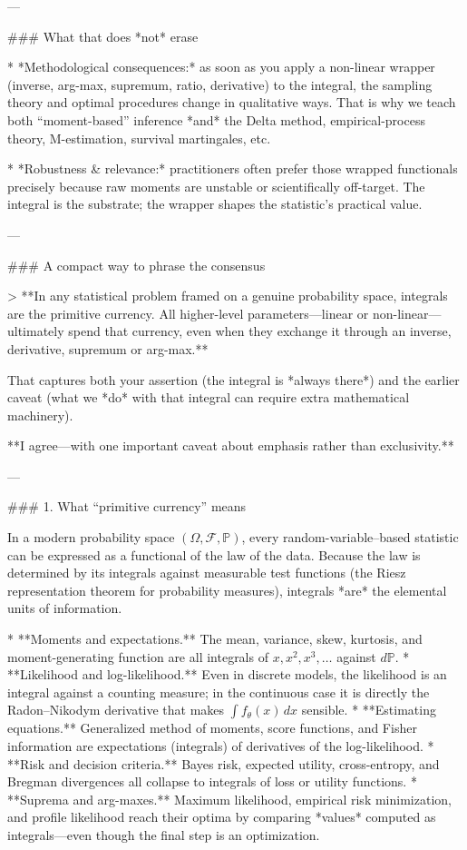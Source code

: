 ---

### What that does *not* erase

* *Methodological consequences:* as soon as you apply a non-linear wrapper (inverse, arg-max, supremum, ratio, derivative) to the integral, the sampling theory and optimal procedures change in qualitative ways.  That is why we teach both “moment-based” inference *and* the Delta method, empirical-process theory, M-estimation, survival martingales, etc.

* *Robustness & relevance:* practitioners often prefer those wrapped functionals precisely because raw moments are unstable or scientifically off-target.  The integral is the substrate; the wrapper shapes the statistic’s practical value.

---

### A compact way to phrase the consensus

> **In any statistical problem framed on a genuine probability space, integrals are the primitive currency.  All higher-level parameters—linear or non-linear—ultimately spend that currency, even when they exchange it through an inverse, derivative, supremum or arg-max.**

That captures both your assertion (the integral is *always there*) and the earlier caveat (what we *do* with that integral can require extra mathematical machinery).

**I agree—with one important caveat about emphasis rather than exclusivity.**

---

### 1.  What “primitive currency” means

In a modern probability space $(\Omega, \mathcal F, \mathbb P)$, every random-variable–based statistic can be expressed as a functional of the law of the data.  Because the law is determined by its integrals against measurable test functions (the Riesz representation theorem for probability measures), integrals *are* the elemental units of information.

* **Moments and expectations.**  The mean, variance, skew, kurtosis, and moment-generating function are all integrals of $x, x^2, x^3,\dots$ against $d\mathbb P$.
* **Likelihood and log-likelihood.**  Even in discrete models, the likelihood is an integral against a counting measure; in the continuous case it is directly the Radon–Nikodym derivative that makes $\int f_\theta(x)\,dx$ sensible.
* **Estimating equations.**  Generalized method of moments, score functions, and Fisher information are expectations (integrals) of derivatives of the log-likelihood.
* **Risk and decision criteria.**  Bayes risk, expected utility, cross-entropy, and Bregman divergences all collapse to integrals of loss or utility functions.
* **Suprema and arg-maxes.**  Maximum likelihood, empirical risk minimization, and profile likelihood reach their optima by comparing *values* computed as integrals—even though the final step is an optimization.


